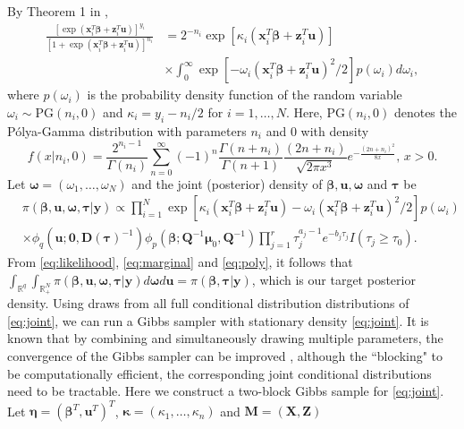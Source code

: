 \documentclass[11pt,a4paper]{article}
\begin{document}
 By Theorem 1 in \cite{polson2013bayesian}, 
\begin{align}
\label{eq:poly}
\frac{\left[\exp\left(\bm{x}_{i}^{T}\bm{\beta}+\bm{z}_{i}^{T}\bm{u}\right)\right]^{y_{i}}}{\left[1+\exp\left(\bm{x}_{i}^{T}\bm{\beta}+\bm{z}_{i}^{T}\bm{u}\right)\right]^{n_{i}}} & =2^{-n_{i}}\exp\left[\kappa_{i}\left(\bm{x}_{i}^{T}\bm{\beta}+\bm{z}_{i}^{T}\bm{u}\right)\right] \nonumber\\
 & \times \int_{0}^{\infty}\exp\left[-\omega_{i}\left(\bm{x}_{i}^{T}\bm{\beta}+\bm{z}_{i}^{T}\bm{u}\right)^{2}/2\right]p\left(\omega_{i}\right)d\omega_{i},
\end{align}
where $p\left(\omega_{i}\right)$ is the probability density function of the random variable $\omega_{i}\sim\text{PG}\left(n_i,0\right)$ and  $\kappa_{i}=y_{i}-n_i/2$ for $i=1,\dots,N$. Here, $\text{PG}(n_i,0)$ denotes the P\'olya-Gamma distribution with parameters $n_i$ and 0 with density \[
f(x\vert n_i,0) =\frac{2^{n_i-1}}{\Gamma(n_i)} \sum_{n=0}^{\infty} (-1)^n \frac{\Gamma(n+n_i)}{\Gamma(n+1)} \frac{(2n+n_i)}{\sqrt{2\pi x^3}} e^{-\frac{(2n+n_i)^2}{8x}}, \, x>0. \]
Let $\bm{\omega} = (\omega_1,\dots, \omega_{N})$ and the joint (posterior) density of $\bm{\beta},\bm{u},\bm{\omega}$ and $\bm{\tau}$ be 
\begin{align}
\label{eq:joint}
&\pi\left(\bm{\beta},\bm{u},\bm{\omega},\bm{\tau}|\bm{y}\right)  \propto \prod_{i=1}^{N}\exp\left[\kappa_{i}\left(\bm{x}_{i}^{T}\bm{\beta}+\bm{z}_{i}^{T}\bm{u}\right)-\omega_{i}\left(\bm{x}_{i}^{T}\bm{\beta}+\bm{z}_{i}^{T}\bm{u}\right)^{2}/2\right]p\left(\omega_{i}\right) \nonumber\\
& \times\phi_{q}\left(\bm{u};\bm{0},\bm{D(\bm{\tau})}^{-1}\right)\phi_{p}\left(\bm{\beta};\bm{Q}^{-1}\bm{\mu}_{0},\bm{Q}^{-1}\right)\prod_{j=1}^{r}  \tau_j^{a_j-1}e^{-b_j\tau_j}I(\tau_j \geq \tau_0).
\end{align}
From \eqref{eq:likelihood}, \eqref{eq:marginal} and \eqref{eq:poly}, it follows that $
\int_{\mathbb{R}^q}\int_{\mathbb{R}_{+}^N} \pi(\bm{\beta},\bm{u}, \bm{\omega},\bm{\tau}|\bm{y})d\bm{\omega} d\bm{u} = \pi(\bm{\beta},\bm{\tau}|\bm{y})$, 
which is our target posterior density. Using draws from all full conditional distribution distributions of \eqref{eq:joint}, we can run a Gibbs sampler with stationary density \eqref{eq:joint}. It is known that by combining and simultaneously drawing multiple parameters, the convergence of the Gibbs sampler can be improved \citep{liu1994covariance}, although the ``blocking" to be computationally efficient, the corresponding joint conditional distributions need to be tractable. Here we construct a two-block Gibbs sample for \eqref{eq:joint}. Let $\bm{\eta}=\left(\bm{\beta}^{T},\bm{u}^{T}\right)^{T}$, $\bm{\kappa} = (\kappa_{1},\dots,\kappa_{n})$ and $\bm{M}=\left(\bm{X},\bm{Z}\right)$
\end{document}
